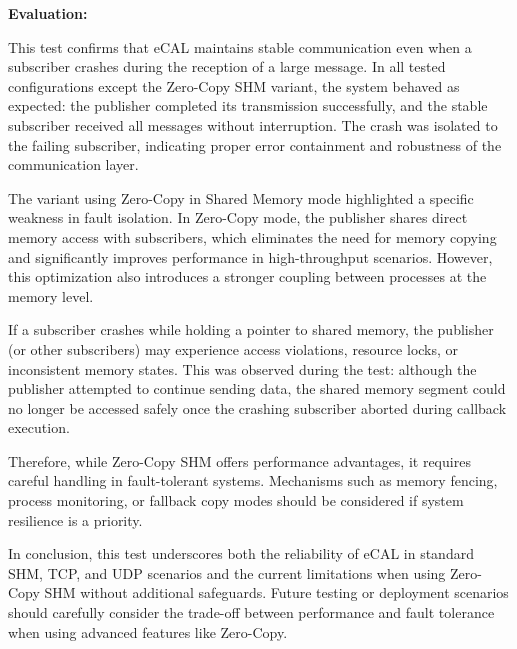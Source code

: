 \vspace{0.5em}

\newpage
\textbf{Evaluation:}

\vspace{0.4em}
This test confirms that eCAL maintains stable communication even when a subscriber crashes during the reception of a large message. In all tested configurations except the Zero-Copy SHM variant, the system behaved as expected: the publisher completed its transmission successfully, and the stable subscriber received all messages without interruption. The crash was isolated to the failing subscriber, indicating proper error containment and robustness of the communication layer.

\vspace{1em}
The variant using Zero-Copy in Shared Memory mode highlighted a specific weakness in fault isolation. In Zero-Copy mode, the publisher shares direct memory access with subscribers, which eliminates the need for memory copying and significantly improves performance in high-throughput scenarios. However, this optimization also introduces a stronger coupling between processes at the memory level.

\vspace{1em}
If a subscriber crashes while holding a pointer to shared memory, the publisher (or other subscribers) may experience access violations, resource locks, or inconsistent memory states. This was observed during the test: although the publisher attempted to continue sending data, the shared memory segment could no longer be accessed safely once the crashing subscriber aborted during callback execution. 

\vspace{1em}
Therefore, while Zero-Copy SHM offers performance advantages, it requires careful handling in fault-tolerant systems. Mechanisms such as memory fencing, process monitoring, or fallback copy modes should be considered if system resilience is a priority.

\vspace{1em}
In conclusion, this test underscores both the reliability of eCAL in standard SHM, TCP, and UDP scenarios and the current limitations when using Zero-Copy SHM without additional safeguards. Future testing or deployment scenarios should carefully consider the trade-off between performance and fault tolerance when using advanced features like Zero-Copy.

\newpage

\vspace{1em}
